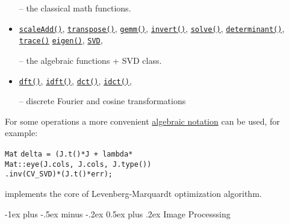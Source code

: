 \documentclass[10pt,landscape]{article}
\makeatletter
\renewcommand{\section}{\@startsection{section}{1}{0mm}%
                                {-1ex plus -.5ex minus -.2ex}%
                                {0.5ex plus .2ex}%
                                {\normalfont\large\bfseries}}
\makeatother
\begin{document}
\begin{multicols}{3}
\begin{itemize}
-- the classical math functions.

\item
\texttt{\href{http://opencv.willowgarage.com/documentation/cpp/operations_on_arrays.html\#cv-scaleadd}{scaleAdd()}},
\texttt{\href{http://opencv.willowgarage.com/documentation/cpp/operations_on_arrays.html\#cv-transpose}{transpose()}},
\texttt{\href{http://opencv.willowgarage.com/documentation/cpp/operations_on_arrays.html\#cv-gemm}{gemm()}},
\texttt{\href{http://opencv.willowgarage.com/documentation/cpp/operations_on_arrays.html\#cv-invert}{invert()}},
\texttt{\href{http://opencv.willowgarage.com/documentation/cpp/operations_on_arrays.html\#cv-solve}{solve()}},
\texttt{\href{http://opencv.willowgarage.com/documentation/cpp/operations_on_arrays.html\#cv-determinant}{determinant()}},
\texttt{\href{http://opencv.willowgarage.com/documentation/cpp/operations_on_arrays.html\#cv-trace}{trace()}}
\texttt{\href{http://opencv.willowgarage.com/documentation/cpp/operations_on_arrays.html\#cv-eigen}{eigen()}},
\texttt{\href{http://opencv.willowgarage.com/documentation/cpp/operations_on_arrays.html\#cv-SVD}{SVD}},

-- the algebraic functions + SVD class.

\item
\texttt{\href{http://opencv.willowgarage.com/documentation/cpp/operations_on_arrays.html\#cv-dft}{dft()}},
\texttt{\href{http://opencv.willowgarage.com/documentation/cpp/operations_on_arrays.html\#cv-idft}{idft()}},
\texttt{\href{http://opencv.willowgarage.com/documentation/cpp/operations_on_arrays.html\#cv-dct}{dct()}},
\texttt{\href{http://opencv.willowgarage.com/documentation/cpp/operations_on_arrays.html\#cv-idct}{idct()}},

-- discrete Fourier and cosine transformations 

\end{itemize}

For some operations a more convenient \href{http://opencv.willowgarage.com/documentation/cpp/basic_structures.html#matrix-expressions}{algebraic notation} can be used, for example:
\begin{tabbing}
\texttt{Mat}\={} \texttt{delta = (J.t()*J + lambda*}\\
\>\texttt{Mat::eye(J.cols, J.cols, J.type())}\\
\>\texttt{.inv(CV\_SVD)*(J.t()*err);}
\end{tabbing}
implements the core of Levenberg-Marquardt optimization algorithm.

\section{Image Processsing}


\end{multicols}
\end{document}
